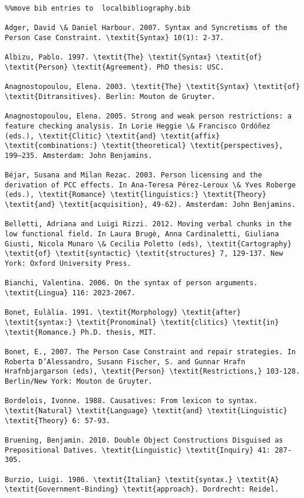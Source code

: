 \documentclass[output=paper,modfonts,nonflat]{langsci/langscibook}
\begin{document}
\begin{verbatim}%%move bib entries to  localbibliography.bib

Adger, David \& Daniel Harbour. 2007. Syntax and Syncretisms of the Person Case Constraint. \textit{Syntax} 10(1): 2-37.

Albizu, Pablo. 1997. \textit{The} \textit{Syntax} \textit{of} \textit{Person} \textit{Agreement}. PhD thesis: USC.

Anagnostopoulou, Elena. 2003. \textit{The} \textit{Syntax} \textit{of} \textit{Ditransitives}. Berlin: Mouton de Gruyter.

Anagnostopoulou, Elena. 2005. Strong and weak person restrictions: a feature checking analysis. In Lorie Heggie \& Francisco Ordóñez (eds.), \textit{Clitic} \textit{and} \textit{affix} \textit{combinations:} \textit{theoretical} \textit{perspectives}, 199–235. Amsterdam: John Benjamins.

Béjar, Susana and Milan Rezac. 2003. Person licensing and the derivation of PCC effects. In Ana-Teresa Pérez-Leroux \& Yves Roberge (eds.), \textit{Romance} \textit{linguistics:} \textit{Theory} \textit{and} \textit{acquisition}, 49-62). Amsterdam: John Benjamins.

Belletti, Adriana and Luigi Rizzi. 2012. Moving verbal chunks in the low functional field. In Laura Brugè, Anna Cardinaletti, Giuliana Giusti, Nicola Munaro \& Cecilia Poletto (eds), \textit{Cartography} \textit{of} \textit{syntactic} \textit{structures} 7, 129-137. New York: Oxford University Press.

Bianchi, Valentina. 2006. On the syntax of person arguments. \textit{Lingua} 116: 2023-2067.

Bonet, Eulàlia. 1991. \textit{Morphology} \textit{after} \textit{syntax:} \textit{Pronominal} \textit{clitics} \textit{in} \textit{Romance.} Ph.D. thesis, MIT.

Bonet, E., 2007. The Person Case Constraint and repair strategies. In Roberta D’Alessandro, Susann Fischer, S. and Gunnar Hrafn Hrafnbjargarson (eds), \textit{Person} \textit{Restrictions,} 103-128. Berlin/New York: Mouton de Gruyter.

Bordelois, Ivonne. 1988. Causatives: From lexicon to syntax. \textit{Natural} \textit{Language} \textit{and} \textit{Linguistic} \textit{Theory} 6: 57-93.

Bruening, Benjamin. 2010. Double Object Constructions Disguised as Prepositional Datives. \textit{Linguistic} \textit{Inquiry} 41: 287-305.

Burzio, Luigi. 1986. \textit{Italian} \textit{syntax.} \textit{A} \textit{Government-Binding} \textit{approach}. Dordrecht: Reidel.


\end{verbatim}
\end{document}
